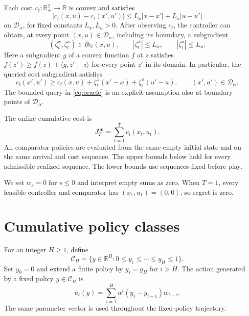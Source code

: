 \documentclass[11pt]{article}
\newcommand{\R}{\mathbb R}
\newcommand{\CH}{\mathcal C_H}
\begin{document}
Each cost $c_t:\R_+^2\to\R$ is convex and satisfies
\begin{equation}
\label{eq:lipschitz}
|c_t(x,u)-c_t(x',u')|
\le L_x|x-x'|+L_u|u-u'|
\end{equation}
on $\mathcal D_\alpha$, for fixed constants $L_x,L_u>0$.
After observing $c_t$, the controller can obtain, at every point
$(x,u)\in\mathcal D_\alpha$, including its boundary, a subgradient
\begin{equation}
\label{eq:oracle}
(\zeta_t^x,\zeta_t^u)\in\partial c_t(x,u),
\qquad
|\zeta_t^x|\le L_x,
\qquad
|\zeta_t^u|\le L_u.
\end{equation}
Here a subgradient $g$ of a convex function $f$ at $z$ satisfies
$f(z')\ge f(z)+\langle g,z'-z\rangle$ for every point $z'$ in
its domain. In particular, the queried cost subgradient satisfies
\begin{equation}
\label{eq:cost-support}
c_t(x',u')\ge c_t(x,u)
+\zeta_t^x(x'-x)+\zeta_t^u(u'-u),
\qquad (x',u')\in\mathcal D_\alpha.
\end{equation}
The bounded query in \eqref{eq:oracle} is an explicit assumption
also at boundary points of $\mathcal D_\alpha$.

The online cumulative cost is
\[
J_T^{\mathrm{on}}=\sum_{t=1}^T c_t(x_t,u_t).
\]
All comparator policies are evaluated from the same empty initial
state and on the same arrival and cost sequence.
The upper bounds below hold for every admissible realized sequence.
The lower bounds use sequences fixed before play.

We set $w_s=0$ for $s\le0$ and interpret empty sums as zero.
When $T=1$, every feasible controller and comparator has
$(x_1,u_1)=(0,0)$, so regret is zero.

\section{Cumulative policy classes}
\label{sec:policies}

For an integer $H\ge1$, define
\begin{equation}
\label{eq:policy-set}
\CH
=
\{y\in\R^H:0\le y_1\le\cdots\le y_H\le1\}.
\end{equation}
Set $y_0=0$ and extend a finite policy by $y_i=y_H$ for $i>H$.
The action generated by a fixed policy $y\in\CH$ is
\begin{equation}
\label{eq:policy-action}
u_t(y)=\sum_{i=1}^H\alpha^i(y_i-y_{i-1})w_{t-i}.
\end{equation}
The same parameter vector is used throughout the fixed-policy
trajectory.
\end{document}
